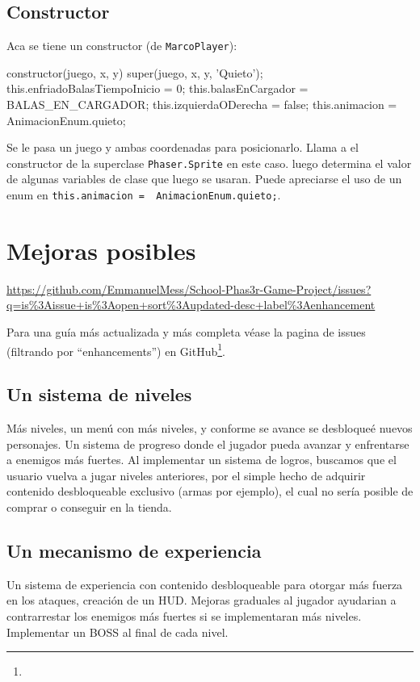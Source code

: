 \documentclass{article}
\newcommand{\insertverbbox}{{\addvbuffer[6pt 3pt]{\theverbbox}\par}}
\begin{document}
	\subsection*{Constructor}
	Aca se tiene un constructor (de \verb|MarcoPlayer|):
	 
	 \begin{verbbox}
		constructor(juego, x, y) {
		    super(juego, x, y, 'Quieto');
		    this.enfriadoBalasTiempoInicio = 0;
		    this.balasEnCargador = BALAS_EN_CARGADOR;
	   	    this.izquierdaODerecha = false;
		    this.animacion = AnimacionEnum.quieto;
		}
	 \end{verbbox}
	 \insertverbbox
	 
	 Se le pasa un juego y ambas coordenadas para posicionarlo. Llama a el constructor de la superclase \verb|Phaser.Sprite| en este caso. luego determina el valor de algunas variables de clase que luego se usaran. Puede apreciarse el uso de un enum en \verb|this.animacion =  AnimacionEnum.quieto;|.
    
   	\section*{Mejoras posibles}
   	\urldef\inserturl\url{https://github.com/EmmanuelMess/School-Phas3r-Game-Project/issues?q=is%3Aissue+is%3Aopen+sort%3Aupdated-desc+label%3Aenhancement}
   		
	Para una guía más actualizada y más completa véase la pagina de issues (filtrando por ``enhancements'') en GitHub\footnote{\inserturl}.
	
   	\subsection*{Un sistema de niveles}
	
	Más niveles, un menú con más niveles, y conforme se avance se desbloqueé nuevos personajes. Un sistema de progreso donde el jugador pueda avanzar y enfrentarse a enemigos más fuertes. Al implementar un sistema de logros, buscamos que el usuario vuelva a jugar niveles anteriores, por el simple hecho de adquirir contenido desbloqueable exclusivo (armas por ejemplo), el cual no sería posible de comprar o conseguir en la tienda.
	
	\subsection*{Un mecanismo de experiencia}
	
	Un sistema de experiencia con contenido desbloqueable para otorgar más fuerza en los ataques, creación de un HUD. Mejoras graduales al jugador ayudarian a contrarrestar los enemigos más fuertes si se implementaran más niveles. Implementar un BOSS al final de cada nivel.
	
\end{document}
